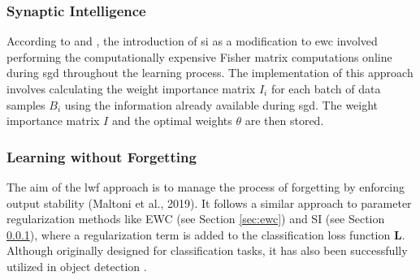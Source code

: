 \subsubsection{Synaptic Intelligence}
\label{sec:si}
According to \citep{zenke2017continual} and \citep{maltoni2019continuous}, the introduction of \acrshort{si} as a modification to \acrshort{ewc} involved performing the computationally expensive Fisher matrix computations online during \acrshort{sgd} throughout the learning process. The implementation of this approach involves calculating the weight importance matrix $I_{i}$ for each batch of data samples $B_{i}$ using the information already available during \acrshort{sgd}. The weight importance matrix $I$ and the optimal weights $\theta$ are then stored.


\subsubsection{Learning without Forgetting}
\label{sec:lwf}
The aim of the \acrshort{lwf} approach is to manage the process of forgetting by enforcing output stability (Maltoni et al., 2019). It follows a similar approach to parameter regularization methods like EWC (see Section \ref{sec:ewc}) and SI (see Section \ref{sec:si}), where a regularization term is added to the classification loss function $\mathbf{L}$. Although originally designed for classification tasks, it has also been successfully utilized in 
object detection \citep{de2021continual}.


